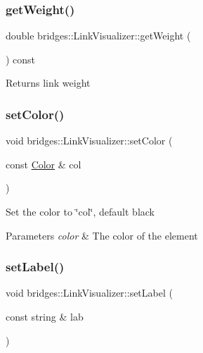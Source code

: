 \subsubsection{\texorpdfstring{get\+Weight()}{getWeight()}}
{\footnotesize\ttfamily double bridges\+::\+Link\+Visualizer\+::get\+Weight (\begin{DoxyParamCaption}{ }\end{DoxyParamCaption}) const\hspace{0.3cm}{\ttfamily [inline]}}

\begin{DoxyReturn}{Returns}
link weight 
\end{DoxyReturn}
\mbox{\label{classbridges_1_1_link_visualizer_adedc1f2b7d5d562b115ef9d8ae19fa73}} 
\subsubsection{\texorpdfstring{set\+Color()}{setColor()}}
{\footnotesize\ttfamily void bridges\+::\+Link\+Visualizer\+::set\+Color (\begin{DoxyParamCaption}\item[{const \mbox{\hyperlink{classbridges_1_1_color}{Color}} \&}]{col }\end{DoxyParamCaption})\hspace{0.3cm}{\ttfamily [inline]}}

Set the color to \char`\"{}col\char`\"{}, default black


\begin{DoxyParams}{Parameters}
{\em color} & The color of the element \\
\hline
\end{DoxyParams}
\mbox{\label{classbridges_1_1_link_visualizer_a7e590ad57c51ef16a1d46e05ffdf1fb3}} 
\subsubsection{\texorpdfstring{set\+Label()}{setLabel()}}
{\footnotesize\ttfamily void bridges\+::\+Link\+Visualizer\+::set\+Label (\begin{DoxyParamCaption}\item[{const string \&}]{lab }\end{DoxyParamCaption})\hspace{0.3cm}{\ttfamily [inline]}}

